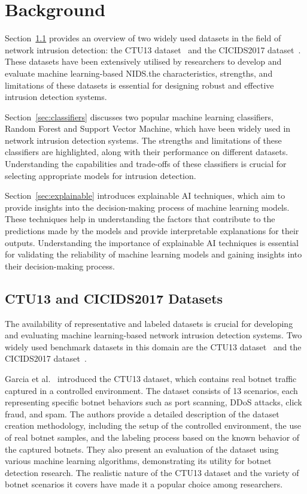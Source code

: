 \chapter{Background}

Section~\ref{sec:datasets} provides an overview of two widely used datasets in the field of network intrusion detection: the CTU13 dataset~\cite{garcia2014empirical} and the CICIDS2017 dataset~\cite{sharafaldin2018toward}. These datasets have been extensively utilised by researchers to develop and evaluate machine learning-based NIDS.\@Understanding the characteristics, strengths, and limitations of these datasets is essential for designing robust and effective intrusion detection systems.

Section~\ref{sec:classifiers} discusses two popular machine learning classifiers, Random Forest and Support Vector Machine, which have been widely used in network intrusion detection systems. The strengths and limitations of these classifiers are highlighted, along with their performance on different datasets. Understanding the capabilities and trade-offs of these classifiers is crucial for selecting appropriate models for intrusion detection.

Section~\ref{sec:explainable} introduces explainable AI techniques, which aim to provide insights into the decision-making process of machine learning models. These techniques help in understanding the factors that contribute to the predictions made by the models and provide interpretable explanations for their outputs. Understanding the importance of explainable AI techniques is essential for validating the reliability of machine learning models and gaining insights into their decision-making process.

\section{CTU13 and CICIDS2017 Datasets}\label{sec:datasets}

The availability of representative and labeled datasets is crucial for developing and evaluating machine learning-based network intrusion detection systems. Two widely used benchmark datasets in this domain are the CTU13 dataset~\cite{garcia2014empirical} and the CICIDS2017 dataset~\cite{sharafaldin2018toward}.

Garcia et al.~\cite{garcia2014empirical} introduced the CTU13 dataset, which contains real botnet traffic captured in a controlled environment. The dataset consists of 13 scenarios, each representing specific botnet behaviors such as port scanning, DDoS attacks, click fraud, and spam. The authors provide a detailed description of the dataset creation methodology, including the setup of the controlled environment, the use of real botnet samples, and the labeling process based on the known behavior of the captured botnets. They also present an evaluation of the dataset using various machine learning algorithms, demonstrating its utility for botnet detection research. The realistic nature of the CTU13 dataset and the variety of botnet scenarios it covers have made it a popular choice among researchers.


